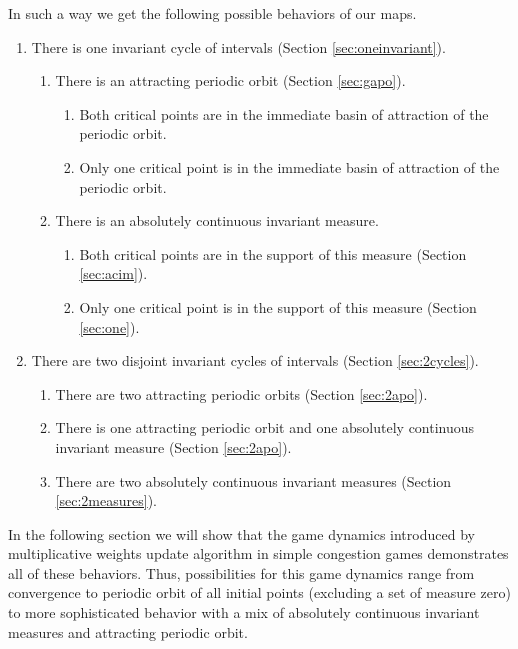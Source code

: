 \documentclass[format=acmsmall, authorversion, screen=true]{acmart}
\begin{document}
In such a way we get the following possible behaviors of our maps.
\begin{enumerate}
\item There is one invariant cycle of intervals (Section \ref{sec:oneinvariant}).
  \begin{enumerate}
  \item There is an attracting periodic orbit (Section \ref{sec:gapo}).
    \begin{enumerate}
    \item Both critical points are in the immediate basin of
      attraction of the periodic orbit.
    \item Only one critical point is in the immediate basin of
      attraction of the periodic orbit.
    \end{enumerate}
  \item There is an absolutely continuous invariant measure.
    \begin{enumerate}
    \item Both critical points are in the support of this measure (Section \ref{sec:acim}).
    \item Only one critical point is in the support of this measure (Section \ref{sec:one}).
    \end{enumerate}
  \end{enumerate}
\item There are two disjoint invariant cycles of intervals (Section \ref{sec:2cycles}).
  \begin{enumerate}
  \item There are two attracting periodic orbits (Section \ref{sec:2apo}).
  \item There is one attracting periodic orbit and one absolutely
    continuous invariant measure (Section \ref{sec:2apo}).
  \item There are two absolutely continuous invariant measures (Section \ref{sec:2measures}).
  \end{enumerate}
\end{enumerate}




In the following section we will show that the game dynamics introduced by multiplicative weights update algorithm in simple congestion games demonstrates all of these behaviors. Thus, possibilities for this game dynamics range from convergence to periodic orbit of all initial points (excluding a set of measure zero) to more sophisticated behavior with a mix of absolutely continuous invariant measures and attracting periodic orbit.  
\end{document}
